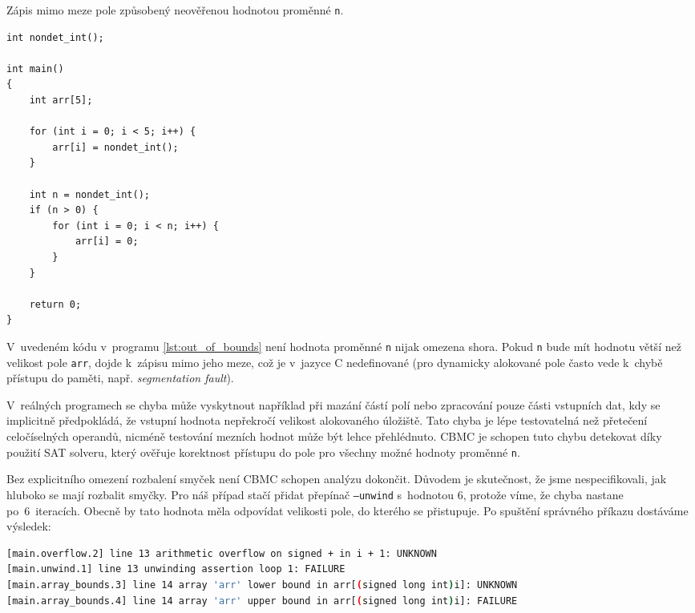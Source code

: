 \documentclass[a4paper, 11pt]{article}
\begin{document}
\begin{listing}[t]
    \caption{Zápis mimo meze pole způsobený neověřenou hodnotou proměnné \texttt{n}.}
    \label{lst:out_of_bounds}
    \begin{verbatim}
int nondet_int();

int main()
{
    int arr[5];

    for (int i = 0; i < 5; i++) {
        arr[i] = nondet_int();
    }

    int n = nondet_int();
    if (n > 0) {
        for (int i = 0; i < n; i++) {
            arr[i] = 0;
        }
    }

    return 0;
}
    \end{verbatim}
\end{listing}

\noindent V~uvedeném kódu v~programu \ref{lst:out_of_bounds} není hodnota proměnné \texttt{n} nijak omezena shora.
Pokud \texttt{n} bude mít hodnotu větší než velikost pole \texttt{arr}, dojde k~zápisu mimo jeho meze, což je v~jazyce C nedefinované (pro dynamicky alokované pole často vede k~chybě přístupu do paměti, např. \emph{segmentation fault}).

V~reálných programech se chyba může vyskytnout například při mazání částí polí nebo zpracování pouze části vstupních dat, kdy se implicitně předpokládá, že vstupní hodnota nepřekročí velikost alokovaného úložiště.
Tato chyba je lépe testovatelná než přetečení celočíselných operandů, nicméně testování mezních hodnot může být lehce přehlédnuto.
CBMC je schopen tuto chybu detekovat díky použití SAT solveru, který ověřuje korektnost přístupu do pole pro všechny možné hodnoty proměnné \texttt{n}.

Bez explicitního omezení rozbalení smyček není CBMC schopen analýzu dokončit.
Důvodem je skutečnost, že jsme nespecifikovali, jak hluboko se mají rozbalit smyčky.
Pro náš případ stačí přidat přepínač \texttt{--unwind} s~hodnotou 6, protože víme, že chyba nastane po~6~iteracích.
Obecně by tato hodnota měla odpovídat velikosti pole, do kterého se přistupuje.
Po spuštění správného příkazu dostáváme výsledek:
\begin{lstlisting}[language=bash]
[main.overflow.2] line 13 arithmetic overflow on signed + in i + 1: UNKNOWN
[main.unwind.1] line 13 unwinding assertion loop 1: FAILURE
[main.array_bounds.3] line 14 array 'arr' lower bound in arr[(signed long int)i]: UNKNOWN
[main.array_bounds.4] line 14 array 'arr' upper bound in arr[(signed long int)i]: FAILURE
\end{lstlisting}
\end{document}
